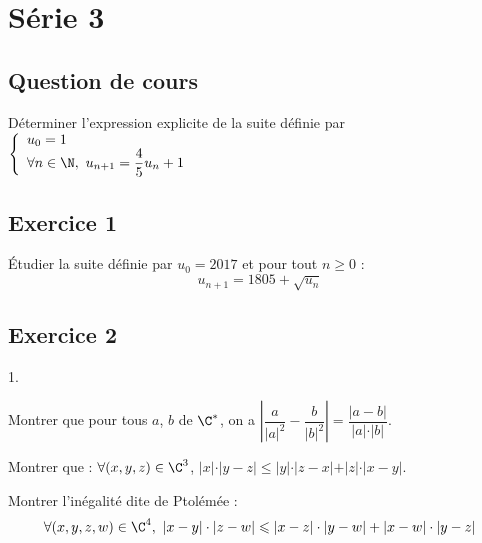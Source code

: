 \documentclass[11pt]{article}%
\begin{document}
\newpage

\section*{Série 3}
\subsection*{Question de cours}
Déterminer l'expression explicite de la suite définie par $\left\{
\begin{array}{ll}
 u_0=1 \\
 \forall n\in\N, \ u_{n+1} = \dfrac{4}{5}u_n +1
\end{array}
\right.$

\subsection*{Exercice 1}
\noindent
Étudier la suite définie par $u_0=2017$ et pour tout $n\geq 0$ :
\[
 u_{n+1} = 1805 + \sqrt{u_n}
\]


\subsection*{Exercice 2}
\begin{noliste}{1.}
 \item Montrer que pour tous $a$, $b$ de $\C^*$, on a $\left\vert 
\dfrac{a}{\vert a \vert^2} - \dfrac{b}{\vert b\vert^2} \right\vert = 
\dfrac{\vert a-b\vert}{\vert a \vert \cdot \vert b \vert}$.
 \item Montrer que : $\forall (x,y,z)\in\C^3$, $\vert x\vert \cdot 
\vert y-z\vert \leq \vert y \vert \cdot \vert z-x\vert + \vert z \vert 
\cdot \vert x-y\vert$.
 \item Montrer l'inégalité dite de Ptolémée :
 \[
  \forall (x,y,z,w)\in\C^4, \ \vert x-y\vert \cdot \vert z-w\vert \leq 
\vert x-z\vert \cdot \vert y-w\vert + \vert x-w\vert \cdot \vert 
y-z\vert
 \]

\end{noliste}
\end{document}
